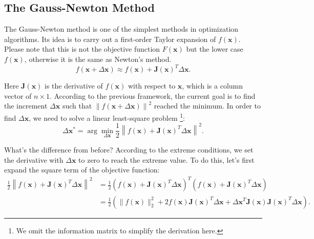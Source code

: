 \subsection{The Gauss-Newton Method}
The Gauss-Newton method is one of the simplest methods in optimization algorithms. Its idea is to carry out a first-order Taylor expansion of $f(\mathbf{x})$. Please note that this is not the objective function $F(\mathbf{x})$ but the lower case $f(\mathbf{x})$, otherwise it is the same as Newton's method.
\begin{equation}
    \label{eq:approximation}
    f\left( {\mathbf{x} + \Delta \mathbf{x}} \right) \approx f\left( \mathbf{x} \right) + \mathbf{J} \left( \mathbf{x} \right)^T \Delta \mathbf{x}.
\end{equation}

Here $\mathbf{J}(\mathbf{x})$ is the derivative of $f(\mathbf{x})$ with respect to $\mathbf{x}$, which is a column vector of $n \times 1$. According to the previous framework, the current goal is to find the increment $\Delta \mathbf{x}$ such that $\left\| {f\left( \mathbf{x} + \Delta \mathbf{x} \right)} \right \|^2$ reached the minimum. In order to find $\Delta \mathbf{x}$, we need to solve a linear least-square problem \footnote{We omit the information matrix to simplify the derivation here.}:
\begin{equation}
    \Delta \mathbf{x}^* = \arg \mathop {\min }\limits_{\Delta \mathbf{x}} \frac{1}{2}{\left\| {f\left( \mathbf{x} \right) + \mathbf{J} \left( \mathbf{x} \right)^T \Delta \mathbf{x} } \right\|^2}.
\end{equation}
    
What's the difference from before? According to the extreme conditions, we set the derivative with $\Delta \mathbf{x}$ to zero to reach the extreme value. To do this, let's first expand the square term of the objective function:
\begin{align*}
    \frac{1}{2}{\left\| {f\left( \mathbf{x} \right) + \mathbf{J} \left( \mathbf{x} \right)^T \Delta \mathbf{x}} \right\|^2} &= \frac{1}{2}{\left( {f\left( \mathbf{x} \right) + \mathbf{J}\left( \mathbf{x} \right)^T \Delta \mathbf{x}} \right)^T}\left( {f\left( \mathbf{x} \right) + \mathbf{J} \left( \mathbf{x} \right)^T \Delta \mathbf{x}} \right)\\
    &= \frac{1}{2}\left( \| f{{\left( \mathbf{x} \right)}\|^2_2 + 2 f\left( \mathbf{x} \right) \mathbf{J} {{\left( \mathbf{x} \right)}}^T \Delta \mathbf{x} + \Delta { \mathbf{x}^T}{\mathbf{J} (\mathbf{x})} \mathbf{J}(\mathbf{x})^T \Delta \mathbf{x}} \right).
\end{align*}


